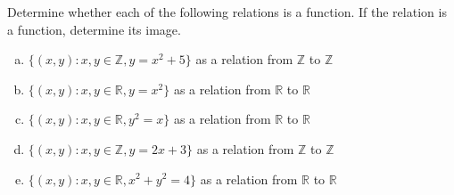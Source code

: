 \documentclass[11pt,letterpaper]{article}
\begin{document}

 Determine whether each of the following relations is a function. If the relation is a function, determine its image.
	\begin{enumerate}[(a)]
	\item $\{ (x, y) \colon x, y \in \mathbb{Z}, y= x^2 + 5 \}$ as a relation from $\mathbb{Z}$ to $\mathbb{Z}$
	\item $\{ (x, y) \colon x, y \in \mathbb{R}, y= x^2 \}$ as a relation from $\mathbb{R}$ to $\mathbb{R}$
	\item $\{ (x, y) \colon x, y \in \mathbb{R}, y^2= x \}$ as a relation from $\mathbb{R}$ to $\mathbb{R}$
	\item $\{ (x, y) \colon x, y \in \mathbb{Z}, y= 2x + 3 \}$ as a relation from $\mathbb{Z}$ to $\mathbb{Z}$
	\item $\{ (x, y) \colon x, y \in \mathbb{R}, x^2 + y^2= 4 \}$ as a relation from $\mathbb{R}$ to $\mathbb{R}$
	\end{enumerate} \pspace
\end{document}
